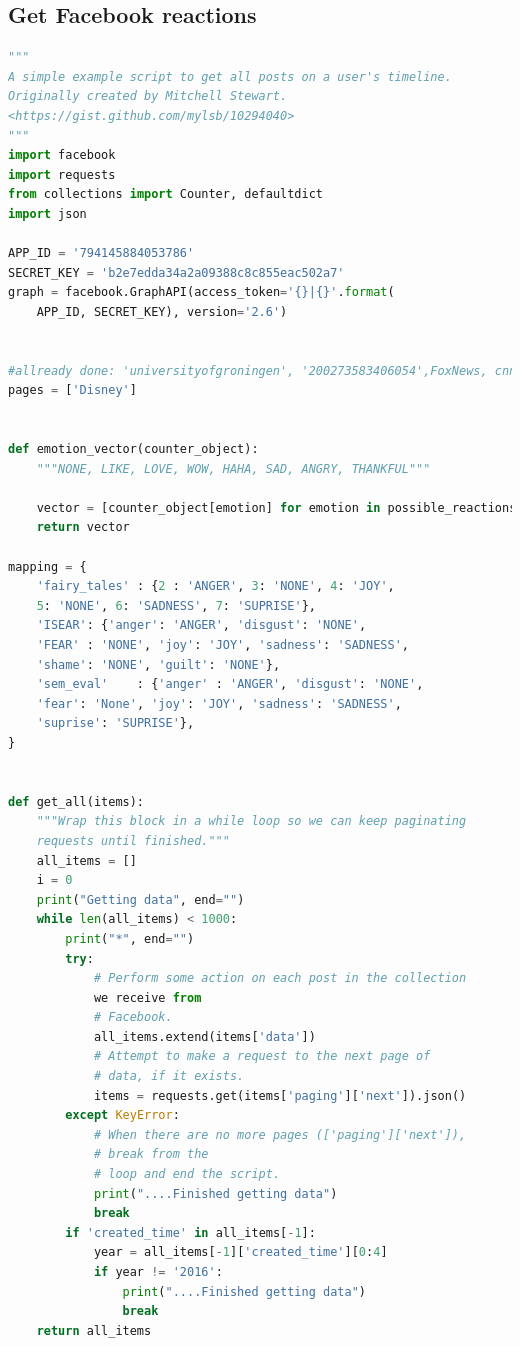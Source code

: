 \documentclass[
10pt, %
a4paper, %
oneside, %
headinclude,footinclude, %
BCOR5mm, %
]{scrartcl}
\begin{document}
\subsection{Get Facebook reactions}
\begin{lstlisting}[language=Python]
"""
A simple example script to get all posts on a user's timeline.
Originally created by Mitchell Stewart.
<https://gist.github.com/mylsb/10294040>
"""
import facebook
import requests
from collections import Counter, defaultdict
import json

APP_ID = '794145884053786'
SECRET_KEY = 'b2e7edda34a2a09388c8c855eac502a7'
graph = facebook.GraphAPI(access_token='{}|{}'.format(
    APP_ID, SECRET_KEY), version='2.6')


#allready done: 'universityofgroningen', '200273583406054',FoxNews, cnn 
pages = ['Disney']


def emotion_vector(counter_object):
    """NONE, LIKE, LOVE, WOW, HAHA, SAD, ANGRY, THANKFUL"""
    
    vector = [counter_object[emotion] for emotion in possible_reactions]
    return vector

mapping = {
    'fairy_tales' : {2 : 'ANGER', 3: 'NONE', 4: 'JOY', 
    5: 'NONE', 6: 'SADNESS', 7: 'SUPRISE'},
    'ISEAR': {'anger': 'ANGER', 'disgust': 'NONE', 
    'FEAR' : 'NONE', 'joy': 'JOY', 'sadness': 'SADNESS',
    'shame': 'NONE', 'guilt': 'NONE'},
    'sem_eval'    : {'anger' : 'ANGER', 'disgust': 'NONE',
    'fear': 'None', 'joy': 'JOY', 'sadness': 'SADNESS',
    'suprise': 'SUPRISE'},
}


def get_all(items):
    """Wrap this block in a while loop so we can keep paginating
    requests until finished."""
    all_items = []
    i = 0
    print("Getting data", end="")
    while len(all_items) < 1000:
        print("*", end="")
        try:
            # Perform some action on each post in the collection
            we receive from
            # Facebook.
            all_items.extend(items['data'])
            # Attempt to make a request to the next page of
            # data, if it exists.
            items = requests.get(items['paging']['next']).json()
        except KeyError:
            # When there are no more pages (['paging']['next']),
            # break from the
            # loop and end the script.
            print("....Finished getting data")
            break
        if 'created_time' in all_items[-1]:
            year = all_items[-1]['created_time'][0:4]
            if year != '2016':
                print("....Finished getting data")
                break
    return all_items



\end{lstlisting}
\end{document}
